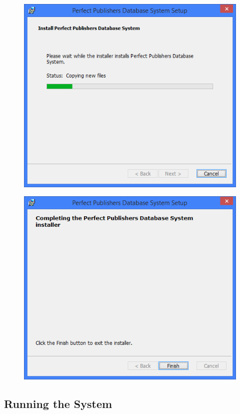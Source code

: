 \begin{figure}[H]
    \includegraphics[width=\textwidth]{./Manual/Installation/Installing.png}
\end{figure}

\begin{figure}[H]
    \includegraphics[width=\textwidth]{./Manual/Installation/Installed.png}
\end{figure}


\subsection{Running the System}

